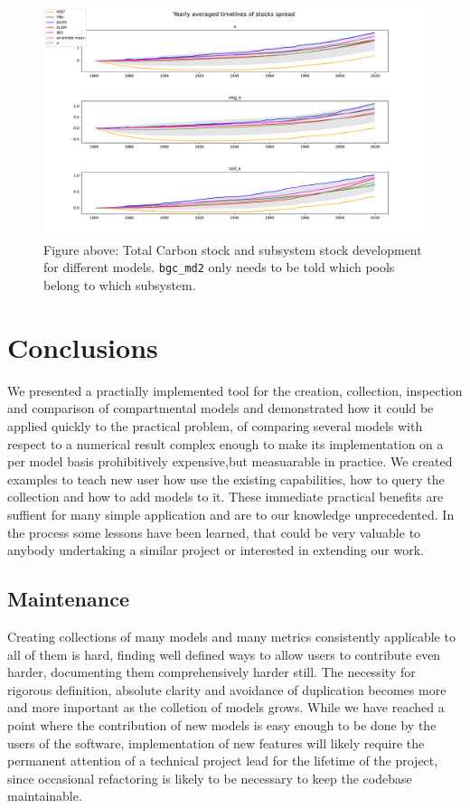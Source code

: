 \begin{figure}[t]
	\includegraphics[width=\columnwidth]{test_stock_mean.pdf}
  \caption{
  Figure above: Total Carbon stock and subsystem stock development for different models.
  \texttt{bgc\_md2} only needs to be told which pools belong to which subsystem.
  }
\end{figure}  


\section{Conclusions}
We presented a practially implemented tool for the creation, collection, inspection and comparison of compartmental models and demonstrated how it could be applied 
quickly to the practical problem, of comparing several models with respect to a numerical result complex enough to make its implementation on a per model basis prohibitively expensive,but measuarable in practice.
We created examples to teach new user how use the existing capabilities, how to 
query the collection and how to add models to it.
These immediate practical benefits are suffient for many simple application and are to our knowledge unprecedented. 
In the process some lessons have been learned, that could be very valuable to anybody undertaking a similar project or interested in extending our work.
\subsection{Maintenance}
Creating collections of many models and many metrics 
consistently applicable to all of them is hard,
finding well defined ways to allow users to 
contribute even harder, documenting them comprehensively 
harder still.
The necessity for rigorous definition, absolute clarity and avoidance of 
duplication becomes more and more important as the colletion of models grows.
While we have reached a point where the contribution of new models is easy enough 
to be done by the users of the software, implementation of new features will likely
require the permanent attention of a technical project lead for 
the lifetime of the project, since occasional refactoring is likely to be necessary
to keep the codebase maintainable.
